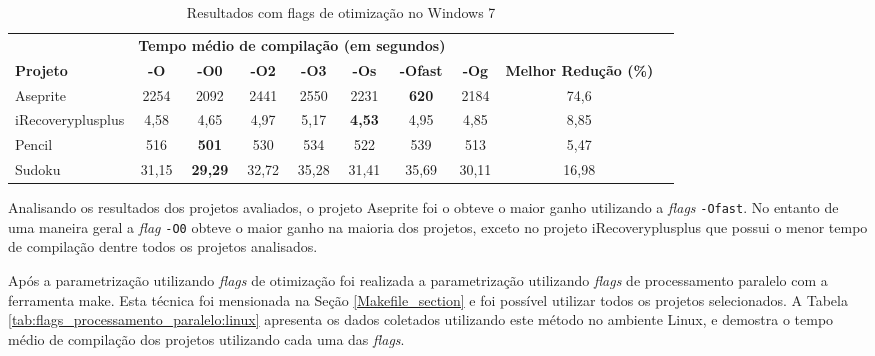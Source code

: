 \begin{table}[!ht]
\tiny
\centering
\caption{Resultados com flags de otimização no Windows 7}
\label{tab:flags_otimizacao:windows}
\begin{tabular}{lccccccccc}
& \multicolumn{6}{c}{\textbf{Tempo médio de compilação (em segundos)} } \\
 \textbf{Projeto}& \textbf{-O}  & \textbf{-O0}   & \textbf{-O2} & \textbf{-O3} & \textbf{-Os} & \textbf{-Ofast} & \textbf{-Og} & \textbf{Melhor Redução (\%)}\\ \toprule
Aseprite            &  2254     & 2092          & 2441   & 2550  & 2231          & \textbf{620}  & 2184  & 74,6  \\ 
iRecoveryplusplus   & 4,58      & 4,65          & 4,97   & 5,17  & \textbf{4,53} & 4,95          &  4,85 &  8,85 \\ 
Pencil              & 516       & \textbf{501}  & 530    & 534   & 522           & 539           & 513   & 5,47 \\ 
Sudoku              & 31,15     & \textbf{29,29} & 32,72 & 35,28 & 31,41         & 35,69         & 30,11 & 16,98 \\ 
\end{tabular}
\end{table}

Analisando os resultados dos projetos avaliados, o projeto Aseprite foi o obteve o maior
 ganho utilizando a \textit{flags} \texttt{-Ofast}. No entanto de uma maneira geral
 a \textit{flag} \texttt{-O0} obteve o maior ganho na maioria dos projetos, exceto no projeto iRecoveryplusplus que possui o menor tempo de compilação dentre todos os projetos analisados.


Após a parametrização utilizando \textit{flags} de otimização foi realizada a
 parametrização utilizando \textit{flags} de processamento paralelo com a ferramenta make.
Esta técnica foi mensionada na Seção \ref{Makefile_section} e foi possível utilizar todos os projetos selecionados.
 A Tabela \ref{tab:flags_processamento_paralelo:linux} apresenta os dados coletados utilizando este método no ambiente Linux, e demostra o tempo médio de compilação dos projetos utilizando cada uma das \textit{flags}.

